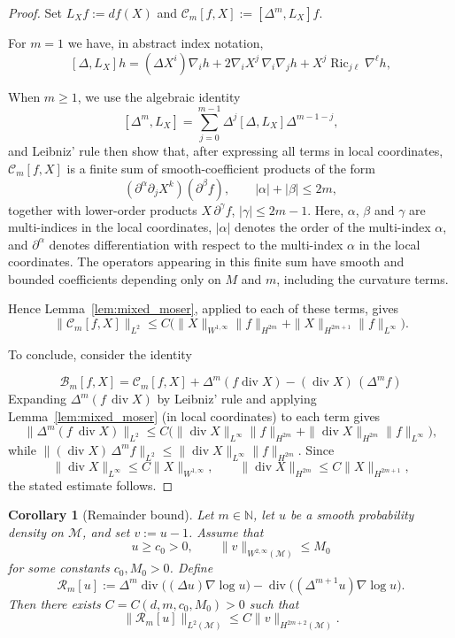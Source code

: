 \documentclass[11pt]{article}
\newtheorem{corollary}[theorem]{Corollary}
\theoremstyle{definition}
\newcommand{\divg}{\operatorname{div}}
\newcommand{\Ric}{\operatorname{Ric}}
\begin{document}
\begin{proof}
Set \(L_Xf:=df(X)\) and
\(\mathcal C_m[f,X]:=[\Delta^m,L_X]f\).   

For \(m=1\) we have, in abstract index notation,
\[
[\Delta,L_X]h
=
(\Delta X^i)\nabla_i h
+
2\nabla_iX^j\,\nabla_i\nabla_jh
+
X^j\Ric_{j\ell}\nabla^\ell h ,
\]





When $m \geq 1$, we use the algebraic identity
\[
[\Delta^m,L_X]
=
\sum_{j=0}^{m-1}\Delta^j[\Delta,L_X]\Delta^{m-1-j},
\]
and Leibniz' rule then show that, after expressing all terms in local coordinates, \(\mathcal C_m[f,X]\) is a finite sum of
smooth-coefficient products of the form
\[
(\partial^\alpha \partial_j X^k)(\partial^\beta f),\qquad |\alpha|+|\beta|\le2m,
\]
together with lower-order products \(X\,\partial^\gamma f\), \(|\gamma|\le2m-1\). Here, $\alpha$, $\beta$  and $\gamma$ are multi-indices in the local coordinates, $|\alpha|$ denotes the order of the multi-index $\alpha$, and $\partial^\alpha$ denotes differentiation with respect to the multi-index $\alpha$ in the local coordinates. The operators
appearing in this finite sum have smooth and bounded coefficients depending
only on \(M\) and \(m\), including the curvature terms.

Hence
Lemma~\ref{lem:mixed_moser}, applied to each of these terms, gives
\[
\|\mathcal C_m[f,X]\|_{L^2}
\le
C
\bigl(
\|X\|_{W^{1,\infty}}\|f\|_{H^{2m}}
+
\|X\|_{H^{2m+1}}\|f\|_{L^\infty}
\bigr).
\]

To conclude, consider the identity

\[
\mathcal B_m[f,X]
=
\mathcal C_m[f,X]+\Delta^m(f\divg X)-(\divg X)\,(\Delta^m f)
\]
Expanding \(\Delta^m(f\, \divg X)\) by Leibniz' rule and applying
Lemma~\ref{lem:mixed_moser} (in local coordinates) to each term gives
\[
\|\Delta^m(f\ \divg X)\|_{L^2}
\le
C
\bigl(
\|\divg X\|_{L^\infty}\|f\|_{H^{2m}}
+
\|\divg X\|_{H^{2m}}\|f\|_{L^\infty}
\bigr),
\]
while $\|(\divg X)\,\Delta^m f\|_{L^2}\le\|\divg X\|_{L^\infty}\|f\|_{H^{2m}}$.  Since
\[
\|\divg X\|_{L^\infty}\le C\|X\|_{W^{1,\infty}},
\qquad
\|\divg X\|_{H^{2m}}\le C\|X\|_{H^{2m+1}},
\]
the stated estimate follows.
\end{proof}

\begin{corollary}[Remainder bound]\label{cor:compact_remainder}
Let $m\in\mathbb N$, let $u$ be a smooth probability density on
$\mathcal{M}$, and set $v:=u-1$.  Assume that
\[
u\ge c_0>0,
\qquad
\|v\|_{W^{2,\infty}(\mathcal{M})}\le M_0
\]
for some constants $c_0,M_0>0$.  Define
\[
\mathcal R_m[u]
:=
\Delta^m \divg\bigl((\Delta u)\nabla \log u\bigr)
-
\divg\bigl((\Delta^{m+1}u)\nabla \log u\bigr).
\]
Then there exists $C=C(d,m,c_0,M_0)>0$ such that
\[
\|\mathcal R_m[u]\|_{L^2(\mathcal{M})}
\le
C\|v\|_{H^{2m+2}(\mathcal{M})}.
\]
\end{corollary}
\end{document}
